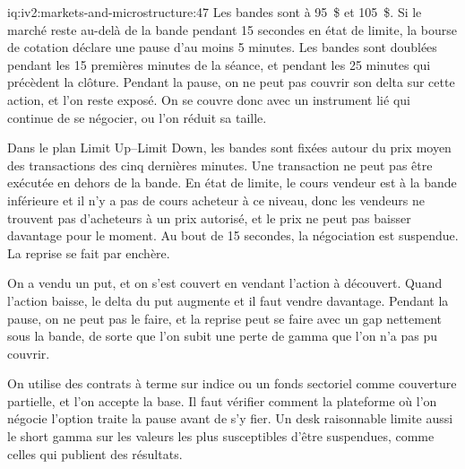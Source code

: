 \begin{solution}{iq:iv2:markets-and-microstructure:47}
Les bandes sont à 95~\$ et 105~\$. Si le marché reste au-delà de la bande pendant 15 secondes en état de limite, la bourse de cotation déclare une pause d'au moins 5 minutes. Les bandes sont doublées pendant les 15 premières minutes de la séance, et pendant les 25 minutes qui précèdent la clôture. Pendant la pause, on ne peut pas couvrir son delta sur cette action, et l'on reste exposé. On se couvre donc avec un instrument lié qui continue de se négocier, ou l'on réduit sa taille.

Dans le plan Limit Up--Limit Down, les bandes sont fixées autour du prix moyen des transactions des cinq dernières minutes. Une transaction ne peut pas être exécutée en dehors de la bande. En état de limite, le cours vendeur est à la bande inférieure et il n'y a pas de cours acheteur à ce niveau, donc les vendeurs ne trouvent pas d'acheteurs à un prix autorisé, et le prix ne peut pas baisser davantage pour le moment. Au bout de 15 secondes, la négociation est suspendue. La reprise se fait par enchère.

On a vendu un put, et on s'est couvert en vendant l'action à découvert. Quand l'action baisse, le delta du put augmente et il faut vendre davantage. Pendant la pause, on ne peut pas le faire, et la reprise peut se faire avec un gap nettement sous la bande, de sorte que l'on subit une perte de gamma que l'on n'a pas pu couvrir.

On utilise des contrats à terme sur indice ou un fonds sectoriel comme couverture partielle, et l'on accepte la base. Il faut vérifier comment la plateforme où l'on négocie l'option traite la pause avant de s'y fier. Un desk raisonnable limite aussi le short gamma sur les valeurs les plus susceptibles d'être suspendues, comme celles qui publient des résultats.

\end{solution}

